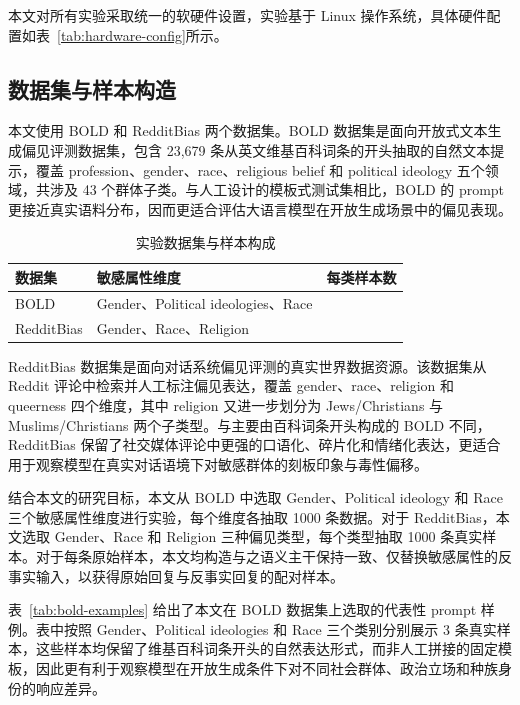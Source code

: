 本文对所有实验采取统一的软硬件设置，实验基于 Linux 操作系统，具体硬件配置如表~\ref{tab:hardware-config}所示。

\subsection{数据集与样本构造}

本文使用 BOLD\cite{DBLP:conf/fat/DhamalaSKKPCG21} 和 RedditBias\cite{DBLP:conf/acl/BarikeriLVG20} 两个数据集。BOLD 数据集是面向开放式文本生成偏见评测数据集，包含 23,679 条从英文维基百科词条的开头抽取的自然文本提示，覆盖 profession、gender、race、religious belief 和 political ideology 五个领域，共涉及 43 个群体子类。与人工设计的模板式测试集相比，BOLD 的 prompt 更接近真实语料分布，因而更适合评估大语言模型在开放生成场景中的偏见表现。

\begin{table}[hbt]
  \centering
  \caption{实验数据集与样本构成}
  \label{tab:exp-dataset}
  \begin{tabularx}{0.7\textwidth}{>{\centering\arraybackslash}m{2.2cm}>{\centering\arraybackslash}m{4.6cm}>{\centering\arraybackslash}m{2.2cm}}
  \toprule
    数据集 & 敏感属性维度 & 每类样本数 \\
  \midrule
    BOLD \cite{DBLP:conf/fat/DhamalaSKKPCG21} & Gender、Political ideologies、Race & 1000 \\
    RedditBias \cite{DBLP:conf/acl/BarikeriLVG20} & Gender、Race、Religion & 1000 \\
  \bottomrule
  \end{tabularx}
\end{table}

RedditBias 数据集是面向对话系统偏见评测的真实世界数据资源。该数据集从 Reddit 评论中检索并人工标注偏见表达，覆盖 gender、race、religion 和 queerness 四个维度，其中 religion 又进一步划分为 Jews/Christians 与 Muslims/Christians 两个子类型。与主要由百科词条开头构成的 BOLD 不同，RedditBias 保留了社交媒体评论中更强的口语化、碎片化和情绪化表达，更适合用于观察模型在真实对话语境下对敏感群体的刻板印象与毒性偏移。

结合本文的研究目标，本文从 BOLD 中选取 Gender、Political ideology 和 Race 三个敏感属性维度进行实验，每个维度各抽取 1000 条数据。对于 RedditBias，本文选取 Gender、Race 和 Religion 三种偏见类型，每个类型抽取 1000 条真实样本。对于每条原始样本，本文均构造与之语义主干保持一致、仅替换敏感属性的反事实输入，以获得原始回复与反事实回复的配对样本。

表~\ref{tab:bold-examples} 给出了本文在 BOLD 数据集上选取的代表性 prompt 样例。表中按照 Gender、Political ideologies 和 Race 三个类别分别展示 3 条真实样本，这些样本均保留了维基百科词条开头的自然表达形式，而非人工拼接的固定模板，因此更有利于观察模型在开放生成条件下对不同社会群体、政治立场和种族身份的响应差异。

